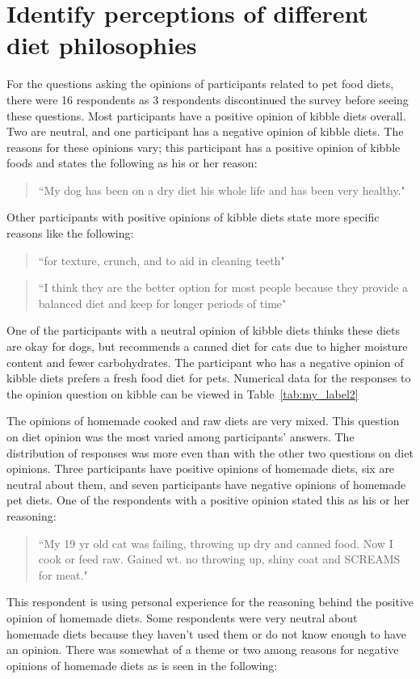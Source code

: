\section{Identify perceptions of different diet philosophies}
For the questions asking the opinions of participants related to pet food diets, there were 16 respondents as 3 respondents discontinued the survey before seeing these questions. Most participants have a positive opinion of kibble diets overall. Two are neutral, and one participant has a negative opinion of kibble diets. The reasons for these opinions vary; this participant has a positive opinion of kibble foods and states the following as his or her reason:
\begin{quote}
``My dog has been on a dry diet his whole life and has been very healthy."
\end{quote}
Other participants with positive opinions of kibble diets state more specific reasons like the following:
\begin{quote}
``for texture, crunch, and to aid in cleaning teeth"
\end{quote}
\begin{quote}``I think they are the better option for most people because they provide a balanced diet and keep for longer periods of time"
\end{quote}
One of the participants with a neutral opinion of kibble diets thinks these diets are okay for dogs, but recommends a canned diet for cats due to higher moisture content and fewer carbohydrates. The participant who has a negative opinion of kibble diets prefers a fresh food diet for pets. Numerical data for the responses to the opinion question on kibble can be viewed in Table~\ref{tab:my_label2}
\par The opinions of homemade cooked and raw diets are very mixed. This question on diet opinion was the most varied among participants' answers. The distribution of responses was more even than with the other two questions on diet opinions. Three participants have positive opinions of homemade diets, six are neutral about them, and seven participants have negative opinions of homemade pet diets. One of the respondents with a positive opinion stated this as his or her reasoning:
\begin{quote}
``My 19 yr old cat was failing, throwing up dry and canned food. Now I cook or feed raw. Gained wt. no throwing up, shiny coat and SCREAMS for meat."
\end{quote}
This respondent is using personal experience for the reasoning behind the positive opinion of homemade diets. Some respondents were very neutral about homemade diets because they haven't used them or do not know enough to have an opinion. There was somewhat of a theme or two among reasons for negative opinions of homemade diets as is seen in the following:
